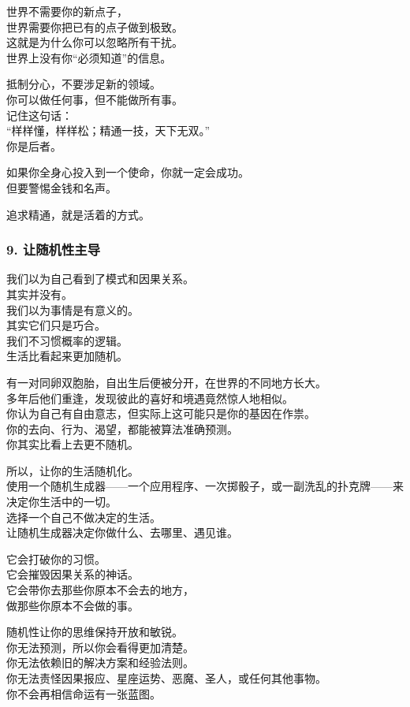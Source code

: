 \documentclass[
]{article}
\begin{document}
世界不需要你的新点子，\\
世界需要你把已有的点子做到极致。\\
这就是为什么你可以忽略所有干扰。\\
世界上没有你``必须知道''的信息。

抵制分心，不要涉足新的领域。\\
你可以做任何事，但不能做所有事。\\
记住这句话：\\
``样样懂，样样松；精通一技，天下无双。''\\
你是后者。

如果你全身心投入到一个使命，你就一定会成功。\\
但要警惕金钱和名声。

追求精通，就是活着的方式。

\subsubsection{9.
让随机性主导}\label{9-ux8ba9ux968fux673aux6027ux4e3bux5bfc}

我们以为自己看到了模式和因果关系。\\
其实并没有。\\
我们以为事情是有意义的。\\
其实它们只是巧合。\\
我们不习惯概率的逻辑。\\
生活比看起来更加随机。

有一对同卵双胞胎，自出生后便被分开，在世界的不同地方长大。\\
多年后他们重逢，发现彼此的喜好和境遇竟然惊人地相似。\\
你认为自己有自由意志，但实际上这可能只是你的基因在作祟。\\
你的去向、行为、渴望，都能被算法准确预测。\\
你其实比看上去更不随机。

所以，让你的生活随机化。\\
使用一个随机生成器------一个应用程序、一次掷骰子，或一副洗乱的扑克牌------来决定你生活中的一切。\\
选择一个自己不做决定的生活。\\
让随机生成器决定你做什么、去哪里、遇见谁。

它会打破你的习惯。\\
它会摧毁因果关系的神话。\\
它会带你去那些你原本不会去的地方，\\
做那些你原本不会做的事。

随机性让你的思维保持开放和敏锐。\\
你无法预测，所以你会看得更加清楚。\\
你无法依赖旧的解决方案和经验法则。\\
你无法责怪因果报应、星座运势、恶魔、圣人，或任何其他事物。\\
你不会再相信命运有一张蓝图。
\end{document}
